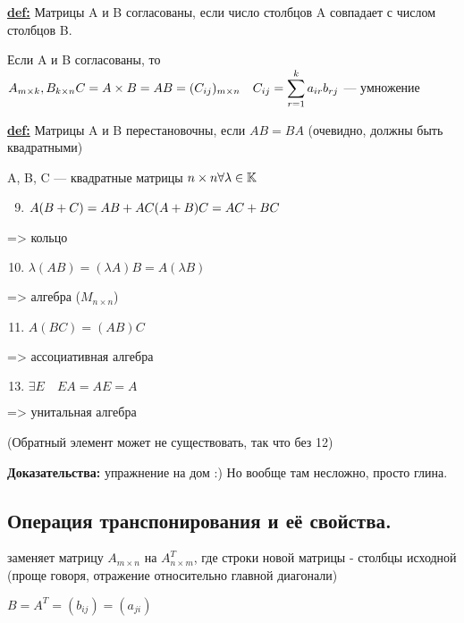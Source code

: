 \textbf{\underline{def:}} Матрицы A и B согласованы, если число столбцов A совпадает с числом столбцов B.

Если A и B согласованы, то
\( A_{m \times k}, B_{k \times n} \newline
C = A \times B = A B = (C_{ij})_{m \times n} \quad C_{ij} = \displaystyle{\sum^{k}_{r=1}a_{ir}b_{rj}} \)
--- умножение

\textbf{\underline{def:}} Матрицы A и B перестановочны, если $ AB = BA $ (очевидно, должны быть квадратными)

A, B, C --- квадратные матрицы $ n \times n \newline
    \forall \lambda \in \mathbb{K}$
\begin{enumerate}
    \setcounter{enumi}{8}
    \item $ A(B+C) = AB + AC \newline
              (A+B)C = AC + BC $
\end{enumerate} => кольцо

\begin{enumerate}
    \setcounter{enumi}{9}
    \item $ \lambda (AB) = (\lambda A)B = A(\lambda B)$
\end{enumerate} => алгебра ($ M_{n \times n} $)

\begin{enumerate}
    \setcounter{enumi}{10}
    \item $ A(BC) = (AB)C$
\end{enumerate} => ассоциативная алгебра

\begin{enumerate}
    \setcounter{enumi}{12}
    \item $ \exists E \quad EA=AE=A$
\end{enumerate} => унитальная алгебра

(Обратный элемент может не существовать, так что без 12)

\textbf{Доказательства:} упражнение на дом :) Но вообще там несложно, просто глина.
\subsection{Операция транспонирования и её свойства.}
 заменяет матрицу $ A_{m \times n} $ на $ A^T_{n \times m} $, где строки новой матрицы - столбцы исходной (проще говоря, отражение относительно главной диагонали)

\( B = A^T = (b_{ij}) = (a_{ji}) \)

